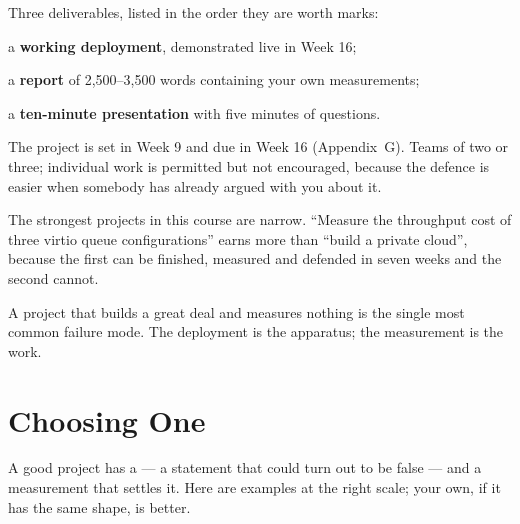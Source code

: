 Three deliverables, listed in the order they are worth marks:

\begin{tight}
  \item a \textbf{working deployment}, demonstrated live in Week 16;
  \item a \textbf{report} of 2{,}500--3{,}500 words containing your own
        measurements;
  \item a \textbf{ten-minute presentation} with five minutes of questions.
\end{tight}

The project is set in Week 9 and due in Week 16 (Appendix~G). Teams of two or
three; individual work is permitted but not encouraged, because the defence is
easier when somebody has already argued with you about it.

\begin{alertbox}
The strongest projects in this course are narrow. ``Measure the throughput cost
of three virtio queue configurations'' earns more than ``build a private
cloud'', because the first can be finished, measured and defended in seven
weeks and the second cannot.

\smallskip
A project that builds a great deal and measures nothing is the single most
common failure mode. The deployment is the apparatus; the measurement is the
work.
\end{alertbox}

\section{Choosing One}

A good project has a  --- a statement that could turn out to be
false --- and a measurement that settles it. Here are examples at the right
scale; your own, if it has the same shape, is better.

